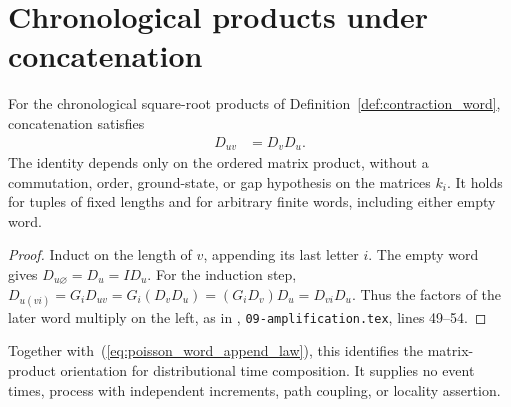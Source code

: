 \section{Chronological products under concatenation}
\label{sec:contraction_word_append}

\begin{theorem}
\label{thm:contraction_word_append}
\leanok
{}
For the chronological square-root products of
Definition~\ref{def:contraction_word}, concatenation satisfies
\begin{align}
 D_{uv}&=D_vD_u.
 \label{eq:contraction_word_append}
\end{align}
The identity depends only on the ordered matrix product, without a
commutation, order, ground-state, or gap hypothesis on the matrices $k_i$.
It holds for tuples of fixed lengths and for arbitrary finite words,
including either empty word.
\end{theorem}
\begin{proof}
\leanok
{}
Induct on the length of $v$, appending its last letter $i$.
The empty word gives $D_{u\varnothing}=D_u=ID_u$.
For the induction step,
$D_{u(vi)}=G_iD_{uv}=G_i(D_vD_u)=(G_iD_v)D_u=D_{vi}D_u$.
Thus the factors of the later word multiply on the left, as in
\cite{OpenAI2026AreaLaw}, \texttt{09-amplification.tex}, lines 49--54.
\end{proof}

Together with~(\ref{eq:poisson_word_append_law}), this identifies the
matrix-product orientation for distributional time composition.
It supplies no event times, process with independent increments,
path coupling, or locality assertion.
